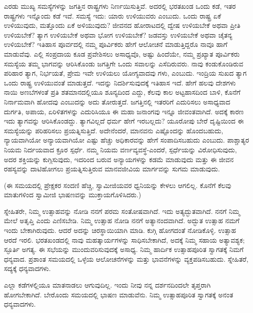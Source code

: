ಎರಡು ಮುಖ್ಯ ಸಮಸ್ಯೆಗಳನ್ನು ಜಗತ್ತಿನ ರಾಷ್ಟ್ರಗಳು ನಿರ್ಣಯಿಸುತ್ತಿವೆ. ಅದರಲ್ಲಿ ಭರತಖಂಡ ಒಂದು ಕಡೆ, ಇತರ ರಾಷ್ಟ್ರಗಳು ಇನ್ನೊಂದು ಕಡೆ ಇವೆ. ಸಮಸ್ಯೆ ಇದು: ಯಾರು ಉಳಿಯುವರು ಎಂಬುದು. ಒಂದು ರಾಷ್ಟ್ರ ಏಕೆ ಉಳಿಯುವುದು, ಮತ್ತೊಂದು ಏಕೆ ಅಳಿಯುವುದು? ಜೀವನದ ಹೋರಾಟದಲ್ಲಿ ದ್ವೇಷ ಉಳಿಯಬೇಕೆ ಅಥವಾ ಪ್ರೀತಿ ಉಳಿಯಬೇಕೆ? ತ್ಯಾಗ ಉಳಿಯಬೇಕೆ ಅಥವಾ ಭೋಗ ಉಳಿಯಬೇಕೆ? ಜಡವಸ್ತು ಉಳಿಯಬೇಕೆ ಅಥವಾ ಚೈತನ್ಯ ಉಳಿಯಬೇಕೆ? ಇತಿಹಾಸ ಪೂರ್ವದಲ್ಲಿ ನಮ್ಮ ಪೂರ್ವಿಕರು ಹೇಗೆ ಆಲೋಚನೆ ಮಾಡುತ್ತಿದ್ದರೊ ನಾವೂ ಹಾಗೆ ಮಾಡುವೆವು. ಎಲ್ಲಿ ಸಂಪ್ರದಾಯ ಕೂಡ ಪ್ರವೇಶಿಸಲು ಅಸಾಧ್ಯವೊ, ಅಷ್ಟು ಹಿಂದೆಯೇ, ನಮ್ಮ ಪ್ರಖ್ಯಾತ ಪೂರ್ವಿಕರು ಸಮಸ್ಯೆಯ ತಮ್ಮ ಭಾಗವನ್ನು ಆರಿಸಿಕೊಂಡು ಜಗತ್ತಿಗೇ ಒಂದು ಸವಾಲನ್ನು ಎಸೆದಿರುವರು. ನಾವು ಕಂಡುಕೊಂಡಿರುವ ಪರಿಹಾರ ತ್ಯಾಗ, ನಿರ್ಭಯತೆ, ಪ್ರೇಮ ಇವೇ ಉಳಿಯಲು ಯೋಗ್ಯವಾದವು ಗಳು, ಎಂಬುದು. ಇಂದ್ರಿಯ ಸುಖದ ತ್ಯಾಗ ಒಂದು ರಾಷ್ಟ್ರ ಉಳಿಯುವಂತೆ ಮಾಡುತ್ತದೆ. ಇದನ್ನು ನಿದರ್ಶಿಸುವುದಕ್ಕೆ ಇತಿಹಾಸ ಇದೆ. ಹೇಗೆ ಹಲವು ದೇಶಗಳು ನಾಯಿ ಅಣಬೆಗಳಂತೆ ಪ್ರತಿ ಶತಮಾನದಲ್ಲಿಯೂ ಶೂನ್ಯದಿಂದ ಎದ್ದು, ಕೆಲವು ಕಾಲ ಅಟ್ಟಹಾಸದಿಂದ ಬಾಳಿ, ಕೊನೆಗೆ ನಿರ್ನಾಮವಾಗಿ ಹೋದವು ಎಂಬುದನ್ನು ಅದು ತೋರುತ್ತದೆ. ಜಗತ್ತಿನಲ್ಲಿ ಇತರರಿಗೆ ಎದುರಿಸಲು ಅಸಾಧ್ಯವಾದ ದುರ್ಗತಿ, ಅಪಾಯ, ಏರಿಳಿತಗಳನ್ನು ಎದುರಿಸಿಯೂ ಈ ಮಹಾ ಜನಾಂಗವು ಇನ್ನೂ ಜೀವಂತವಾಗಿದೆ. ಅದಕ್ಕೆ ಕಾರಣ ಇದು ತ್ಯಾಗವನ್ನು ಆರಿಸಿಕೊಂಡದ್ದು. ತ್ಯಾಗವಿಲ್ಲದೆ ಧರ್ಮ ಹೇಗೆ ಇರಬಲ್ಲದು? ಯೂರೋಪು ಬೇರೆ ದೃಷ್ಟಿಯಿಂದ ಈ ಸಮಸ್ಯೆಯನ್ನು ಪರಿಹರಿಸಲು ಪ್ರಯತ್ನಿಸುತ್ತಿದೆ. ಅದೇನೆಂದರೆ, ಮಾನವನು ಎಷ್ಟೊಂದನ್ನು ಹೊಂದಬಹುದು, ನ್ಯಾಯವಾಗಿಯೋ ಅನ್ಯಾಯವಾಗಿಯೋ ಎಷ್ಟು ಹೆಚ್ಚು ಅಧಿಕಾರವನ್ನು ಹೇಗೆ ಸಂಪಾದಿಸಬಹುದು ಎಂಬುದು. ಪಾಶ್ಚಾತ್ಯರ ನಿಯಮ ನಿರ್ದಯವಾದ ಕ್ರೂರ ಸ್ಪರ್ಧೆ. ನಮ್ಮ ನಿಯಮ ವರ್ಣವ್ಯವಸ್ಥೆ-ಎಂದರೆ, ಸ್ಪರ್ಧೆಯನ್ನು ವಿರೋಧಿಸು\-ವುದು, ಅದರ ಶಕ್ತಿಯನ್ನು ಕುಗ್ಗಿಸುವುದು, ಇದರಿಂದ ಬರುವ ಅನ್ಯಾಯಗಳನ್ನು ಕಡಮೆ ಮಾಡುವುದು ಮತ್ತು ಈ ಜೀವನ ರಹಸ್ಯವನ್ನು ದಾಟಿಹೋಗಲು ಪ್ರಯತ್ನಿಸುತ್ತಿರುವ ಮಾನವಜೀವಿಯ ಮಾರ್ಗವನ್ನು ಸುಗಮ ಮಾಡುವುದು.

(ಈ ಸಮಯದಲ್ಲಿ ಪ್ರೇಕ್ಷಕರ ಸಂದಣಿ ಹೆಚ್ಚಿ, ಸ್ವಾಮೀಜಿಯವರ ಧ್ವನಿಯನ್ನು ಕೇಳಲು ಆಗಲಿಲ್ಲ. ಕೊನೆಗೆ ಕೆಲವು ಮಾತುಗಳಿಂದ ಸ್ವಾಮೀಜಿ ಭಾಷಣವನ್ನು ಮುಕ್ತಾಯಗೊಳಿಸಿದರು.)

ಸ್ನೇಹಿತರೇ, ನಿಮ್ಮ ಉತ್ಸಾಹವನ್ನು ನೋಡಿ ನನಗೆ ಪರಮ ಸಂತೋಷವಾಗಿದೆ. ಇದು ಅತ್ಯದ್ಭುತವಾಗಿದೆ. ನನಗೆ ನಿಮ್ಮ ಮೇಲೆ ಅತೃಪ್ತಿ ಎಂದು ಎಣಿಸಬೇಡಿ. ನಿಮ್ಮ ಉತ್ಸಾಹ ನೋಡಿ ನನಗೆ ಅತ್ಯಾನಂದವಾಗಿದೆ. ಅದ್ಭುತ ಉತ್ಸಾಹ ನಮಗೆ ಇಂದು ಬೇಕಾಗಿರುವುದು. ಆದರೆ ಅದನ್ನು ಚಿರಸ್ಥಾಯಿಯಾಗಿ ಮಾಡಿ. ಕುಗ್ಗಿ ಹೋಗದಂತೆ ನೋಡಿಕೊಳ್ಳಿ. ಉತ್ಸಾಹ ಆರದೆ ಇರಲಿ. ಭರತಖಂಡದಲ್ಲಿ ನಾವು ಮಹತ್ಕಾರ್ಯಗಳನ್ನು ಸಾಧಿಸಬೇಕಾಗಿದೆ, ಅದಕ್ಕೆ ನಿಮ್ಮ ಸಹಾಯ ಅತ್ಯಾವಶ್ಯಕ; ಸ್ಫೂರ್ತಿ ಅಗತ್ಯ. ಈ ಸಭೆಯನ್ನು ಮುಂದುವರಿಸುವುದಕ್ಕೆ ಅಸಾಧ್ಯ. ನಿಮ್ಮ ಹಾರ್ದಿಕ ಉತ್ಸಾಹಪೂರಿತ ಸ್ವಾಗತಕ್ಕೆ ನಿಮಗೆ ಧನ್ಯವಾದ. ಪ್ರಶಾಂತ ಸಮಯದಲ್ಲಿ ಒಳ್ಳೆಯ ಆಲೋಚನೆಗಳನ್ನು ಮತ್ತು ಭಾವನೆಗಳನ್ನು ವ್ಯಕ್ತಪಡಿಸಬಹುದು. ಸ್ನೇಹಿತರೆ, ಸದ್ಯಕ್ಕೆ ಧನ್ಯವಾದಗಳು.

\newpage

ಎಲ್ಲಾ ಕಡೆಗಳಲ್ಲಿಯೂ ಮಾತನಾಡಲು ಆಗುವುದಿಲ್ಲ. ಇಂದು ನೀವು ನನ್ನ ದರ್ಶನದಿಂದಲೇ ತೃಪ್ತರಾಗಿ ಹೋಗಬೇಕಾಗಿದೆ. ಬೇರೊಂದು ಸಮಯದಲ್ಲಿ ಭಾಷಣ ಮಾಡುವೆನು. ನಿಮ್ಮ ಉತ್ಸಾಹಪೂರಿತ ಸ್ವಾಗತಕ್ಕೆ ಅನಂತ ಧನ್ಯವಾದಗಳು.

